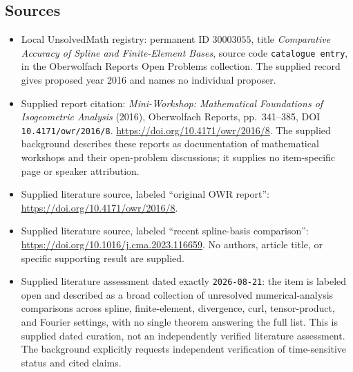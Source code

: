 \documentclass[11pt]{article}
\begin{document}
\subsection{Sources}
\begin{itemize}
\item Local UnsolvedMath registry: permanent ID \(30003055\), title \emph{Comparative Accuracy of Spline and Finite-Element Bases}, source code \texttt{catalogue entry}, in the Oberwolfach Reports Open Problems collection. The supplied record gives proposed year 2016 and names no individual proposer.
\item Supplied report citation: \emph{Mini-Workshop: Mathematical Foundations of Isogeometric Analysis} (2016), Oberwolfach Reports, pp.~341--385, DOI \texttt{10.4171/owr/2016/8}. \url{https://doi.org/10.4171/owr/2016/8}. The supplied background describes these reports as documentation of mathematical workshops and their open-problem discussions; it supplies no item-specific page or speaker attribution.
\item Supplied literature source, labeled ``original OWR report'': \url{https://doi.org/10.4171/owr/2016/8}.
\item Supplied literature source, labeled ``recent spline-basis comparison'': \url{https://doi.org/10.1016/j.cma.2023.116659}. No authors, article title, or specific supporting result are supplied.
\item Supplied literature assessment dated exactly \texttt{2026-08-21}: the item is labeled open and described as a broad collection of unresolved numerical-analysis comparisons across spline, finite-element, divergence, curl, tensor-product, and Fourier settings, with no single theorem answering the full list. This is supplied dated curation, not an independently verified literature assessment. The background explicitly requests independent verification of time-sensitive status and cited claims.
\end{itemize}
\end{document}
